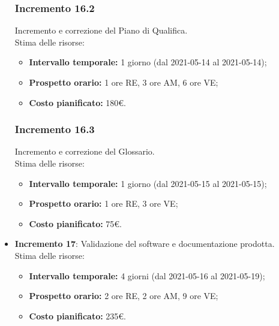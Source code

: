 \begin{itemize}
\subsubsection{Incremento 16.2}
Incremento e correzione del Piano di Qualifica.\\
Stima delle risorse:
\begin{itemize}
	\item \textbf{Intervallo temporale:} 1 giorno (dal 2021-05-14 al 2021-05-14);
	\item \textbf{Prospetto orario:} 1 ore RE, 3 ore AM, 6 ore VE;
	\item \textbf{Costo pianificato:} 180\euro.
\end{itemize}
\subsubsection{Incremento 16.3}
Incremento e correzione del Glossario.\\
Stima delle risorse:
\begin{itemize}
	\item \textbf{Intervallo temporale:} 1 giorno (dal 2021-05-15 al 2021-05-15);
	\item \textbf{Prospetto orario:} 1 ore RE, 3 ore VE;
	\item \textbf{Costo pianificato:} 75\euro.
\end{itemize}


\item \textbf{Incremento 17}:
Validazione del software e documentazione prodotta.\\
Stima delle risorse:
\begin{itemize}
	\item \textbf{Intervallo temporale:} 4 giorni (dal 2021-05-16 al 2021-05-19);
	\item \textbf{Prospetto orario:} 2 ore RE, 2 ore AM, 9 ore VE;
	\item \textbf{Costo pianificato:} 235\euro.
\end{itemize}


\end{itemize}
